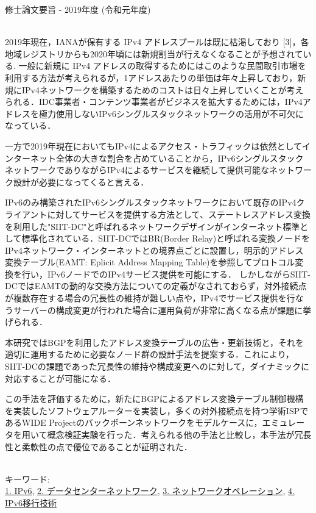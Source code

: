 修士論文要旨 - 2019年度 (令和元年度)
\begin{center}
\begin{large}
\end{large}
\end{center}

~ \\

2019年現在，IANAが保有する IPv4 アドレスプールは既に枯渇しており [3]，各地域レジストリからも2020年頃には新規割当が行えなくなることが予想されている.
一般に新規に IPv4 アドレスの取得するためにはこのような民間取引市場を利用する方法が考えられるが，1アドレスあたりの単価は年々上昇しており，新規にIPv4ネットワークを構築するためのコストは日々上昇していくことが考えられる．IDC事業者・コンテンツ事業者がビジネスを拡大するためには，IPv4アドレスを極力使用しないIPv6シングルスタックネットワークの活用が不可欠になっている．

一方で2019年現在においてもIPv4によるアクセス・トラフィックは依然としてインターネット全体の大きな割合を占めていることから，IPv6シングルスタックネットワークでありながらIPv4によるサービスを継続して提供可能なネットワーク設計が必要になってくると言える．


IPv6のみ構築されたIPv6シングルスタックネットワークにおいて既存のIPv4クライアントに対してサービスを提供する方法として、ステートレスアドレス変換を利用した"SIIT-DC"と呼ばれるネットワークデザインがインターネット標準として標準化されている．SIIT-DCではBR(Border Relay)と呼ばれる変換ノードをIPv4ネットワーク・インターネットとの境界点ごとに設置し，明示的アドレス変換テーブル(EAMT: Eplicit Address Mapping Table)を参照してプロトコル変換を行い，IPv6ノードでのIPv4サービス提供を可能にする．
しかしながらSIIT-DCではEAMTの動的な交換方法についての定義がなされておらず，対外接続点が複数存在する場合の冗長性の維持が難しい点や，IPv4でサービス提供を行なうサーバーの構成変更が行われた場合に運用負荷が非常に高くなる点が課題に挙げられる．

本研究ではBGPを利用したアドレス変換テーブルの広告・更新技術と，それを適切に運用するために必要なノード群の設計手法を提案する．これにより，SIIT-DCの課題であった冗長性の維持や構成変更へのに対して，ダイナミックに対応することが可能になる．

この手法を評価するために，新たにBGPによるアドレス変換テーブル制御機構を実装したソフトウェアルーターを実装し，多くの対外接続点を持つ学術ISPであるWIDE Projectのバックボーンネットワークをモデルケースに，エミュレータを用いて概念検証実験を行った．考えられる他の手法と比較し，本手法が冗長性と柔軟性の点で優位であることが証明された．







~ \\
キーワード:\\
\underline{1. IPv6},
\underline{2. データセンターネットワーク},
\underline{3. ネットワークオペレーション},
\underline{4. IPv6移行技術}
\begin{flushright}
\dept \\
\author
\end{flushright}
